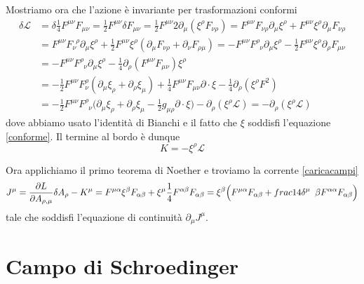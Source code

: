     Mostriamo ora che l'azione è invariante per trasformazioni conformi 
\begin{equation*}
\begin{aligned}
    \delta \mathcal L & = \delta \frac{1}{4} F^{\mu\nu} F_{\mu\nu} = \frac{1}{2} F^{\mu\nu} \delta F_{\mu\nu} = \frac{1}{2} F^{\mu\nu} 2 \partial_\mu (\xi^\rho F_{\nu \rho}) = F^{\mu\nu} F_{\nu\rho} \partial_\mu \xi^\rho + F^{\mu\nu} \xi^\rho \partial_\mu F_{\nu\rho} \\ & = F^{\mu\nu} F_\nu^{\phantom \nu \rho} \partial_\mu \xi^\rho + \frac{1}{2} F^{\mu\nu} \xi^\rho (\partial_\mu F_{\nu\rho} + \partial_\nu F_{\rho\mu}) = - F^{\mu\nu} F^\rho_{\phantom \rho \nu} \partial_\mu \xi^\rho - \frac{1}{2} F^{\mu\nu} \xi^\rho \partial_\rho F_{\mu\nu} \\ & = - F^{\mu\nu} F^\rho_{\phantom \rho \nu} \partial_\mu \xi^\rho - \frac{1}{4} \partial_\rho (F^{\mu\nu} F_{\mu\nu}) \xi^\rho \\ & = - \frac{1}{2} F^{\mu\nu} F^\rho_{\nu} (\partial_\mu \xi_\rho + \partial_\rho \xi_\mu) + \frac{1}{4} F^{\mu\nu} F_{\mu\nu} \partial \cdot \xi - \frac{1}{4} \partial_\rho (\xi^\rho F^2) \\ & = - \frac{1}{2} F^{\mu\nu} F^\rho_{\phantom \rho \nu} \Big ( \partial_\mu \xi_\rho + \partial_\rho \xi_\mu - \frac{1}{2} g_{\mu\rho} \partial \cdot \xi \Big) - \partial_\rho(\xi^\rho \mathcal L) = - \partial_\rho(\xi^\rho \mathcal L)
\end{aligned}
\end{equation*}
    dove abbiamo usato l'identità di Bianchi e il fatto che $\xi$ soddisfi l'equazione \eqref{conforme}. Il termine al bordo è dunque 
\begin{equation*}
    K = - \xi^\rho \mathcal L
\end{equation*}

    Ora applichiamo il primo teorema di Noether e troviamo la corrente \eqref{caricacampi} 
\begin{equation*}
    J^\mu = \pdv{L}{A_{\rho,\mu}} \delta A_\rho - K^\mu = F^{\mu\alpha} \xi^\beta F_{\alpha\beta} +  \xi^\mu \frac{1}{4} F^{\alpha\beta} F_{\alpha\beta} = \xi^\beta \Big ( F^{\mu \alpha} F_{\alpha \beta} + frac{1}{4} \delta^\mu{\phantom \rho \beta} F^{\alpha \alpha} F_{\alpha \beta} \Big)
\end{equation*}
    tale che soddisfi l'equazione di continuità $\partial_\mu J^\mu$. 

\section{Campo di Schroedinger}


